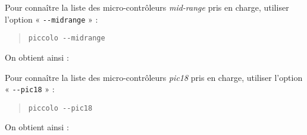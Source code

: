 Pour connaître la liste des micro-contrôleurs \emph{mid-range} pris en charge, utiliser l’option « \texttt{-{}-midrange} » :
\begin{quote}
\texttt{piccolo -{}-midrange}
\end{quote}

On obtient ainsi : 



Pour connaître la liste des micro-contrôleurs \emph{pic18} pris en charge, utiliser l’option « \texttt{-{}-pic18} » :
\begin{quote}
\texttt{piccolo -{}-pic18}
\end{quote}


On obtient ainsi : 


